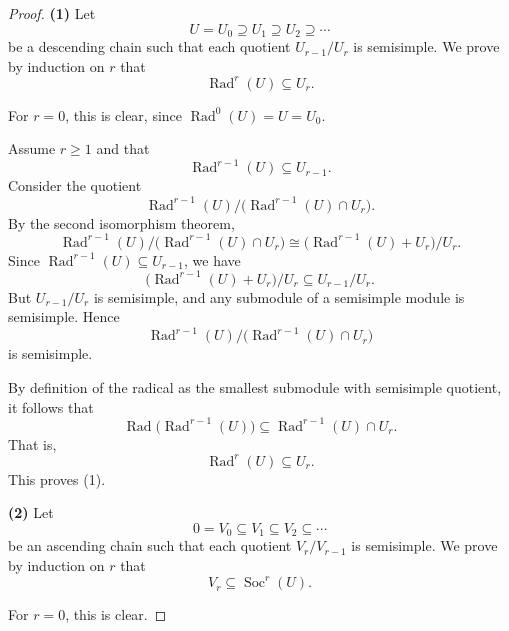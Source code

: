 \begin{proof}
    \textbf{(1)} Let
    \[
        U=U_0\supseteq U_1\supseteq U_2\supseteq \cdots
    \]
    be a descending chain such that each quotient $U_{r-1}/U_r$ is semisimple.
    We prove by induction on $r$ that
    \[
        \operatorname{Rad}^r(U)\subseteq U_r.
    \]

    For $r=0$, this is clear, since $\operatorname{Rad}^0(U)=U=U_0$.

    Assume $r\ge 1$ and that
    \[
        \operatorname{Rad}^{r-1}(U)\subseteq U_{r-1}.
    \]
    Consider the quotient
    \[
        \operatorname{Rad}^{r-1}(U)\big/\bigl(\operatorname{Rad}^{r-1}(U)\cap U_r\bigr).
    \]
    By the second isomorphism theorem,
    \[
        \operatorname{Rad}^{r-1}(U)\big/\bigl(\operatorname{Rad}^{r-1}(U)\cap U_r\bigr)
        \cong
        \bigl(\operatorname{Rad}^{r-1}(U)+U_r\bigr)/U_r.
    \]
    Since $\operatorname{Rad}^{r-1}(U)\subseteq U_{r-1}$, we have
    \[
        \bigl(\operatorname{Rad}^{r-1}(U)+U_r\bigr)/U_r
        \subseteq
        U_{r-1}/U_r.
    \]
    But $U_{r-1}/U_r$ is semisimple, and any submodule of a semisimple module is semisimple.
    Hence
    \[
        \operatorname{Rad}^{r-1}(U)\big/\bigl(\operatorname{Rad}^{r-1}(U)\cap U_r\bigr)
    \]
    is semisimple.

    By definition of the radical as the smallest submodule with semisimple quotient, it follows that
    \[
        \operatorname{Rad}\bigl(\operatorname{Rad}^{r-1}(U)\bigr)
        \subseteq
        \operatorname{Rad}^{r-1}(U)\cap U_r.
    \]
    That is,
    \[
        \operatorname{Rad}^r(U)\subseteq U_r.
    \]
    This proves \textup{(1)}.

    \bigskip

    \textbf{(2)} Let
    \[
        0=V_0\subseteq V_1\subseteq V_2\subseteq \cdots
    \]
    be an ascending chain such that each quotient $V_r/V_{r-1}$ is semisimple.
    We prove by induction on $r$ that
    \[
        V_r\subseteq \operatorname{Soc}^r(U).
    \]

    For $r=0$, this is clear.


\end{proof}
